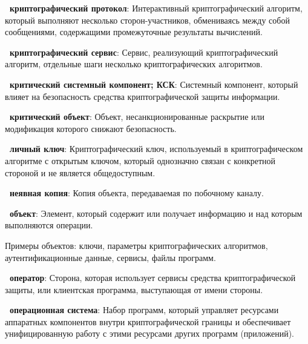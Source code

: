 
{\bf \thedefctr~криптографический протокол}:
Интерактивный криптографический алгоритм, который выполняют 
несколько сторон-участников, обмениваясь между собой сообщениями,
содержащими промежуточные результаты вычислений. 

{\bf \thedefctr~криптографический сервис}:
Сервис, реализующий криптографический алгоритм, 
 отдельные шаги  
несколько криптографических алгоритмов.

{\bf \thedefctr~критический системный компонент; КСК}:
Системный компонент, который влияет на безопасность средства криптографической 
защиты информации.


{\bf \thedefctr~критический объект}: 
Объект, несанкционированные раскрытие или модификация которого 
снижают безопасность.

{\bf \thedefctr~личный ключ}:
Криптографический ключ, используемый в криптографическом алгоритме с открытым
ключом, который однозначно связан с конкретной стороной и не является
общедоступным.

{\bf \thedefctr~неявная копия}:
Копия объекта, передаваемая по побочному каналу.

{\bf \thedefctr~объект}: 
Элемент, который содержит или получает информацию
и над которым выполняются операции.

\begin{note}
Примеры объектов: ключи, параметры криптографических алгоритмов, 
аутентификационные данные, сервисы, файлы программ.
\end{note}

{\bf \thedefctr~оператор}:
Сторона, которая использует сервисы средства криптографической 
защиты, или клиентская программа, выступающая от имени стороны.

{\bf \thedefctr~операционная система}:
Набор программ, который управляет ресурсами аппаратных компонентов внутри 
криптографической границы и обеспечивает унифицированную работу с этими 
ресурсами других программ (приложений).

